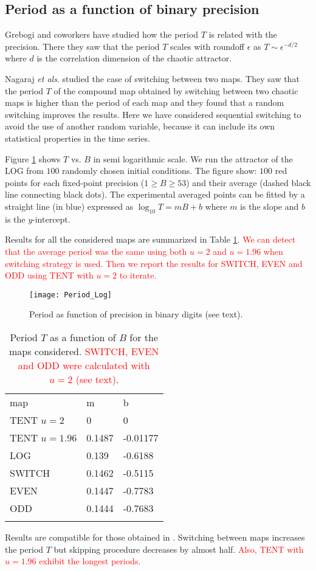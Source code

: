 \subsection{Period as a function of binary precision}

Grebogi and coworkers \cite{Grebogi1988} have studied how the period $T$ is related with the precision.
There they saw that the period $T$ scales with roundoff $\epsilon$ as $T\sim\epsilon^{-d/2}$ where $d$ is the correlation dimension of the chaotic attractor.

Nagaraj \textit{et als}. \cite{Nagaraj2008} studied the case of switching between two maps.
They saw that the period $T$ of the compound map obtained by switching between two chaotic maps is higher than the period of each map and they found that a random switching improves the results.
Here we have considered sequential switching to avoid the use of another random variable, because it can include its own statistical properties in the time series.

Figure \ref{fig:period} shows  $T$ vs. $B$ in semi logarithmic scale.
We run the attractor of the LOG from $100$ randomly chosen initial conditions.
The figure show: $100$ red points for each fixed-point precision ($1\geq B \geq 53$) and their average (dashed black line connecting black dots).
The experimental averaged points can be fitted by a straight line (in blue) expressed as $\log_{10}T=m B + b$ where $m$ is the slope and $b$ is the $y$-intercept.

Results for all the considered maps are summarized in Table \ref{tabla:periodos}.
\textcolor{red}{We can detect that the average period was the same using both $u=2$ and $u=1.96$ when switching strategy is used.
Then we report the results for SWITCH, EVEN and ODD using TENT with $u=2$ to iterate.}
%
\begin{figure}[H]
\centering	
	\texttt{[image: Period\_Log]}
	\caption{Period as function of precision in binary digits (see text).}
	\label{fig:period}
\end{figure}
%
\begin{table}[H]
\centering	
	\caption{Period $T$ as a function of $B$ for the maps considered. \textcolor{red}{SWITCH, EVEN and ODD were calculated with $u=2$ (see text)}.}
	\vspace{1em}
	\begin{tabular}{lll}
		\hline\noalign{\smallskip}
		map 			& m 	& b  \\
		\noalign{\smallskip}\hline\noalign{\smallskip}
		TENT $u=2$		&0 		& 0 \\
		TENT $u=1.96$ 	&0.1487 & -0.01177 \\
		LOG 			&0.139 	& -0.6188 \\
		SWITCH 			&0.1462 & -0.5115 \\
		EVEN 			&0.1447 & -0.7783 \\
		ODD 			&0.1444 & -0.7683 \\
		\noalign{\smallskip}\hline
	\end{tabular}
	\label{tabla:periodos}	
\end{table}

Results are compatible for those obtained in \cite{Nagaraj2008}.
Switching between maps increases the period $T$ but skipping procedure decreases by almost half.
\textcolor{red}{Also, TENT with $u=1.96$ exhibit the longest periods.}